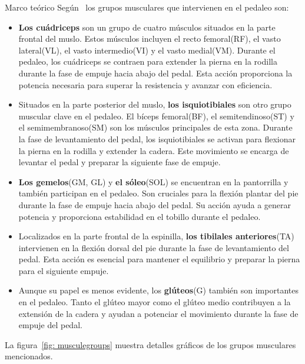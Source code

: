 \begin{thesischapter}{1} {Marco teórico}
    \vspace{10pt}
    Según~\cite{Losmúscu21} los grupos musculares que intervienen en el pedaleo son:

    \begin{itemize}
        \item \textbf{Los cuádriceps} son un grupo de cuatro músculos situados en la parte frontal del muslo. Estos músculos incluyen el recto femoral(RF), el vasto lateral(VL), el vasto intermedio(VI) y el vasto medial(VM). Durante el pedaleo, los cuádriceps se contraen para extender la pierna en la rodilla durante la fase de empuje hacia abajo del pedal. Esta acción proporciona la potencia necesaria para superar la resistencia y avanzar con eficiencia.
        
        \item Situados en la parte posterior del muslo, \textbf{los isquiotibiales} son otro grupo muscular clave en el pedaleo. El bíceps femoral(BF), el semitendinoso(ST) y el semimembranoso(SM) son los músculos principales de esta zona. Durante la fase de levantamiento del pedal, los isquiotibiales se activan para flexionar la pierna en la rodilla y extender la cadera. Este movimiento se encarga de levantar el pedal y preparar la siguiente fase de empuje.
        
        \item \textbf{Los gemelos}(GM, GL) y \textbf{el sóleo}(SOL) se encuentran en la pantorrilla y también participan en el pedaleo. Son cruciales para la flexión plantar del pie durante la fase de empuje hacia abajo del pedal. Su acción ayuda a generar potencia y proporciona estabilidad en el tobillo durante el pedaleo.
        
        \item Localizados en la parte frontal de la espinilla, \textbf{los tibilales anteriores}(TA) intervienen en la flexión dorsal del pie durante la fase de levantamiento del pedal. Esta acción es esencial para mantener el equilibrio y preparar la pierna para el siguiente empuje.
        
        \item Aunque su papel es menos evidente, los \textbf{glúteos}(G) también son importantes en el pedaleo. Tanto el glúteo mayor como el glúteo medio contribuyen a la extensión de la cadera y ayudan a potenciar el movimiento durante la fase de empuje del pedal.
    \end{itemize}

    \vspace{10pt}
    La figura~\ref{fig: musculegroups} muestra detalles gráficos de los grupos musculares mencionados.


\end{thesischapter}
